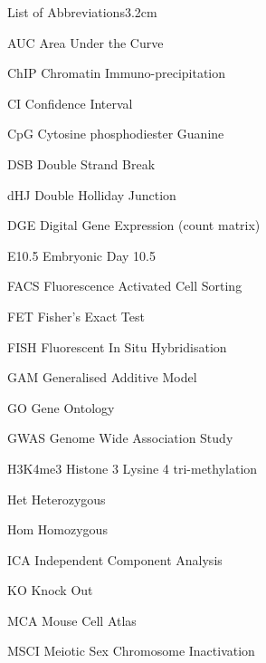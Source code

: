 \begin{mclistof}{List of Abbreviations}{3.2cm}

\item[AUC] Area Under the Curve

\item[ChIP] Chromatin Immuno-precipitation

\item[CI] Confidence Interval

\item[CpG] Cytosine phosphodiester Guanine

\item[DSB] Double Strand Break

\item[dHJ] Double Holliday Junction

\item[DGE] Digital Gene Expression (count matrix)

\item[E10.5] Embryonic Day 10.5

\item[FACS] Fluorescence Activated Cell Sorting

\item[FET] Fisher's Exact Test

\item[FISH] Fluorescent In Situ Hybridisation

\item[GAM] Generalised Additive Model

\item[GO] Gene Ontology

\item[GWAS] Genome Wide Association Study

\item[H3K4me3] Histone 3 Lysine 4 tri-methylation

\item[Het] Heterozygous

\item[Hom] Homozygous

\item[ICA] Independent Component Analysis

\item[KO] Knock Out

\item[MCA] Mouse Cell Atlas

\item[MSCI] Meiotic Sex Chromosome Inactivation


\end{mclistof}
